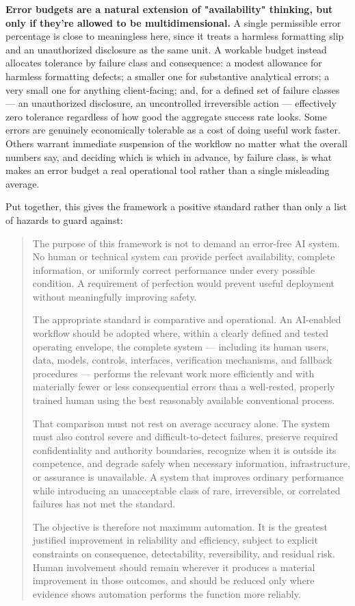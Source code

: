 \textbf{Error budgets are a natural extension of "availability" thinking, but only if they're allowed to be multidimensional.} A single permissible error percentage is close to meaningless here, since it treats a harmless formatting slip and an unauthorized disclosure as the same unit. A workable budget instead allocates tolerance by failure class and consequence: a modest allowance for harmless formatting defects; a smaller one for substantive analytical errors; a very small one for anything client-facing; and, for a defined set of failure classes --- an unauthorized disclosure, an uncontrolled irreversible action --- effectively zero tolerance regardless of how good the aggregate success rate looks. Some errors are genuinely economically tolerable as a cost of doing useful work faster. Others warrant immediate suspension of the workflow no matter what the overall numbers say, and deciding which is which in advance, by failure class, is what makes an error budget a real operational tool rather than a single misleading average.

Put together, this gives the framework a positive standard rather than only a list of hazards to guard against:

\begin{quote}
The purpose of this framework is not to demand an error-free AI system. No human or technical system can provide perfect availability, complete information, or uniformly correct performance under every possible condition. A requirement of perfection would prevent useful deployment without meaningfully improving safety.

The appropriate standard is comparative and operational. An AI-enabled workflow should be adopted where, within a clearly defined and tested operating envelope, the complete system --- including its human users, data, models, controls, interfaces, verification mechanisms, and fallback procedures --- performs the relevant work more efficiently and with materially fewer or less consequential errors than a well-rested, properly trained human using the best reasonably available conventional process.

That comparison must not rest on average accuracy alone. The system must also control severe and difficult-to-detect failures, preserve required confidentiality and authority boundaries, recognize when it is outside its competence, and degrade safely when necessary information, infrastructure, or assurance is unavailable. A system that improves ordinary performance while introducing an unacceptable class of rare, irreversible, or correlated failures has not met the standard.

The objective is therefore not maximum automation. It is the greatest justified improvement in reliability and efficiency, subject to explicit constraints on consequence, detectability, reversibility, and residual risk. Human involvement should remain wherever it produces a material improvement in those outcomes, and should be reduced only where evidence shows automation performs the function more reliably.

\end{quote}

